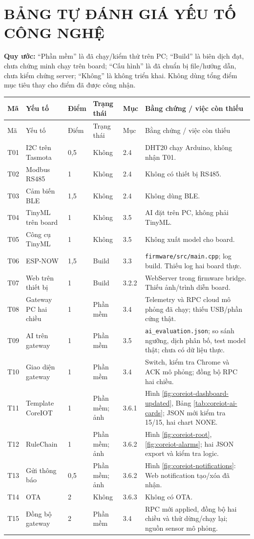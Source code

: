 \documentclass[12pt,a4paper,oneside]{report}
\newcommand{\code}[1]{\nolinkurl{#1}}
\begin{document}
\chapter*{BẢNG TỰ ĐÁNH GIÁ YẾU TỐ CÔNG NGHỆ}
\noindent\textbf{Quy ước:} ``Phần mềm'' là đã chạy/kiểm thử trên PC; ``Build'' là biên dịch đạt, chưa chứng minh chạy trên board; ``Cấu hình'' là đã chuẩn bị file/hướng dẫn, chưa kiểm chứng server; ``Không'' là không triển khai. Không dùng tổng điểm mục tiêu thay cho điểm đã được công nhận.
\small
\begin{longtable}{P{.8cm}P{3.5cm}P{.95cm}P{2cm}P{1.2cm}P{4.85cm}}
\toprule Mã & Yếu tố & Điểm & Trạng thái & Mục & Bằng chứng / việc còn thiếu \\ \midrule
\endfirsthead
\toprule Mã & Yếu tố & Điểm & Trạng thái & Mục & Bằng chứng / việc còn thiếu \\ \midrule
\endhead
T01 & I2C trên Tasmota & 0,5 & Không & 2.4 & DHT20 chạy Arduino, không nhận T01. \\
T02 & Modbus RS485 & 1 & Không & 2.4 & Không có thiết bị RS485. \\
T03 & Cảm biến BLE & 1,5 & Không & 2.4 & Không dùng BLE. \\
T04 & TinyML trên board & 1 & Không & 3.5 & AI đặt trên PC, không phải TinyML. \\
T05 & Công cụ TinyML & 1 & Không & 3.5 & Không xuất model cho board. \\
T06 & ESP-NOW & 1,5 & Build & 3.3 & \code{firmware/src/main.cpp}; log build. Thiếu log hai board thực. \\
T07 & Web trên thiết bị & 1 & Build & 3.2.2 & WebServer trong firmware bridge. Thiếu ảnh/trình diễn board. \\
T08 & Gateway PC hai chiều & 1 & Phần mềm & 3.4 & Telemetry và RPC cloud mô phỏng đã chạy; thiếu USB/phần cứng thật. \\
T09 & AI trên gateway & 1 & Phần mềm & 3.5 & \code{ai_evaluation.json}; so sánh ngưỡng, dịch phân bố, test model thật; chưa có dữ liệu thực. \\
T10 & Giao diện gateway & 1 & Phần mềm & 3.4 & Switch, kiểm tra Chrome và ACK mô phỏng; đồng bộ RPC hai chiều. \\
T11 & Template CoreIOT & 1 & Phần mềm; ảnh & 3.6.1 & Hình \ref{fig:coreiot-dashboard-updated}, Bảng \ref{tab:coreiot-ai-cards}; JSON mới kiểm tra 15/15, hai chart NONE. \\
T12 & RuleChain & 1 & Phần mềm; ảnh & 3.6.2 & Hình \ref{fig:coreiot-root}, \ref{fig:coreiot-alarms}; hai JSON export và kiểm tra logic. \\
T13 & Gửi thông báo & 0,5 & Phần mềm; ảnh & 3.6.2 & Hình \ref{fig:coreiot-notifications}: Web notification tạo/xóa đã nhận. \\
T14 & OTA & 2 & Không & 3.6.3 & Không có OTA. \\
T15 & Đồng bộ gateway & 2 & Phần mềm & 3.4 & RPC mới applied, đồng bộ hai chiều và thử dừng/chạy lại; nguồn sensor mô phỏng. \\
\bottomrule
\end{longtable}
\end{document}
